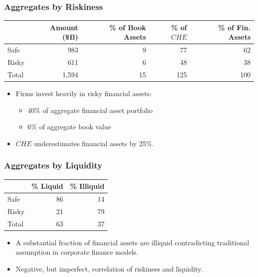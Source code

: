 \documentclass[handout]{beamer}
\begin{document}
\begin{frame}
\frametitle{Aggregates by Riskiness}

\footnotesize

\begin{center}
\begin{tabular}{ l | r r r r }
& Amount (\$B) & \% of Book Assets & \% of $CHE$ & \% of Fin. Assets\\ 
\hline
 Safe  & 983 & 9 & 77 & 62 \\  
 Risky & 611 & 6 & 48 & 38 \\
 \hline
 Total & 1,594 & 15 & 125 & 100
\end{tabular}
\end{center}

\normalsize
\begin{itemize}[<+->]
\item Firms invest heavily in risky financial assets:
\begin{itemize}[<+->]
\item 40\% of aggregate financial asset portfolio
\item 6\% of aggregate book value
\end{itemize}
\item $CHE$ underestimates financial assets by 25\%.
\end{itemize}

\end{frame}




\begin{frame}
\frametitle{Aggregates by Liquidity}

\footnotesize

\begin{center}
\begin{tabular}{ l | r r}
& \% Liquid & \% Illiquid \\ 
\hline
 Safe  & 86 & 14 \\  
 Risky & 21 & 79 \\
 \hline
 Total & 63 & 37
\end{tabular}
\end{center}

\normalsize

\begin{itemize}[<+->]
\item A substantial fraction of financial assets are illiquid contradicting traditional assumption in corporate finance models.
\item Negative, but imperfect, correlation of riskiness and liquidity.
\end{itemize}

\end{frame}
\end{document}
